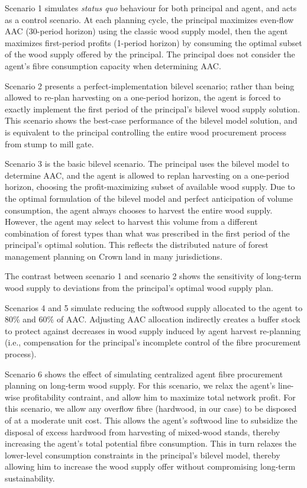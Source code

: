 Scenario 1 simulates \emph{status quo} behaviour for both principal and agent, and acts as a control scenario. At each planning cycle, the principal maximizes even-flow AAC (30-period horizon) using the classic wood supply model, then the agent maximizes first-period profits (1-period horizon) by consuming the optimal subset of the wood supply offered by the principal. The principal does not consider the agent's fibre consumption capacity when determining AAC. 

Scenario 2 presents a perfect-implementation bilevel scenario; rather than being allowed to re-plan harvesting on a one-period horizon, the agent is forced to exactly implement the first period of the principal's bilevel wood supply solution. This scenario shows the best-case performance of the bilevel model solution, and is equivalent to the principal controlling the entire wood procurement process from stump to mill gate.

Scenario 3 is the basic bilevel scenario. The principal uses the bilevel model to determine AAC, and the agent is allowed to replan harvesting on a one-period horizon, choosing the profit-maximizing subset of available wood supply. Due to the optimal formulation of the bilevel model and perfect anticipation of volume consumption, the agent always chooses to harvest the entire wood supply. However, the agent may select to harvest this volume from a different combination of forest types than what was prescribed in the first period of the principal's optimal solution. This reflects the distributed nature of forest management planning on Crown land in many jurisdictions.

The contrast between scenario 1 and scenario 2 shows the sensitivity of long-term wood supply to deviations from the principal's optimal wood supply plan.

Scenarios 4 and 5 simulate reducing the softwood supply allocated to the agent to 80\% and 60\% of AAC. Adjusting AAC allocation indirectly creates a buffer stock to protect against decreases in wood supply induced by agent harvest re-planning (i.e., compensation for the principal's incomplete control of the fibre procurement process).

Scenario 6 shows the effect of simulating centralized agent fibre procurement planning on long-term wood supply. For this scenario, we relax the agent's line-wise profitability contraint, and allow him to maximize total network profit. For this scenario, we allow any overflow fibre (hardwood, in our case) to be disposed of at a moderate unit cost. This allows the agent's softwood line to subsidize the disposal of excess hardwood from harvesting of mixed-wood stands, thereby increasing the agent's total potential fibre consumption. This in turn relaxes the lower-level consumption constraints in the principal's bilevel model, thereby allowing him to increase the wood supply offer without compromising long-term sustainability. 


